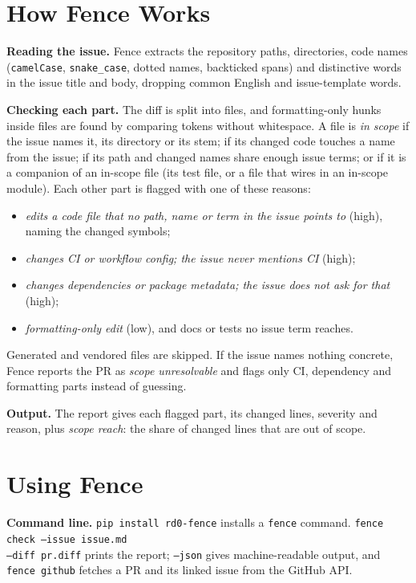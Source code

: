\documentclass[sigconf]{acmart}
\begin{document}
\section{How Fence Works}
\textbf{Reading the issue.} Fence extracts the repository paths, directories, code names (\texttt{camelCase}, \texttt{snake\_case}, dotted names, backticked spans) and distinctive words in the issue title and body, dropping common English and issue-template words.

\textbf{Checking each part.} The diff is split into files, and formatting-only hunks inside files are found by comparing tokens without whitespace. A file is \emph{in scope} if the issue names it, its directory or its stem; if its changed code touches a name from the issue; if its path and changed names share enough issue terms; or if it is a companion of an in-scope file (its test file, or a file that wires in an in-scope module). Each other part is flagged with one of these reasons:
\begin{itemize}
\item \emph{edits a code file that no path, name or term in the issue points to} (high), naming the changed symbols;
\item \emph{changes CI or workflow config; the issue never mentions CI} (high);
\item \emph{changes dependencies or package metadata; the issue does not ask for that} (high);
\item \emph{formatting-only edit} (low), and docs or tests no issue term reaches.
\end{itemize}
Generated and vendored files are skipped. If the issue names nothing concrete, Fence reports the PR as \emph{scope unresolvable} and flags only CI, dependency and formatting parts instead of guessing.

\textbf{Output.} The report gives each flagged part, its changed lines, severity and reason, plus \emph{scope reach}: the share of changed lines that are out of scope.

\section{Using Fence}
\textbf{Command line.} \texttt{pip install rd0-fence} installs a \texttt{fence} command. \texttt{fence check --issue issue.md\\--diff pr.diff} prints the report; \texttt{--json} gives machine-readable output, and \texttt{fence github} fetches a PR and its linked issue from the GitHub API.
\end{document}
